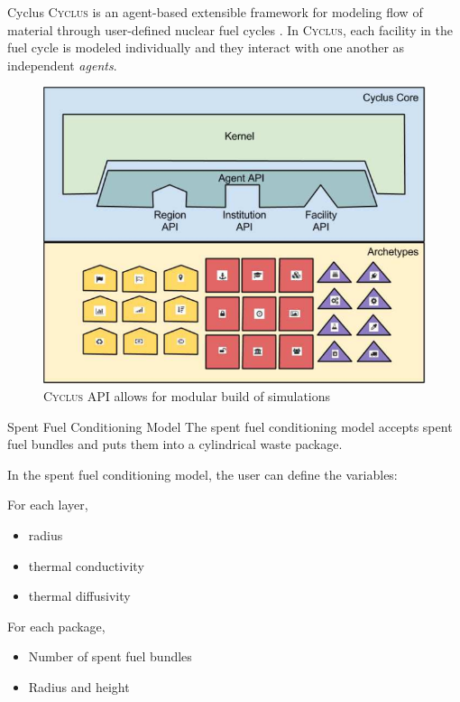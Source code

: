 \documentclass[final]{beamer}
\newlength{\onecolwid}
\newlength{\threecolwid}
\newcommand{\Cyclus}{\textsc{Cyclus}\xspace}%
\begin{document}
\begin{frame}[t]
\begin{columns}[t,totalwidth=\threecolwid]
\begin{column}{\onecolwid}
\begin{block}{Cyclus}
\Cyclus is an agent-based extensible framework for modeling flow of material 
through user-defined nuclear fuel cycles \cite{huff_fundamental_2016}. 
In \Cyclus, each facility in the fuel cycle is modeled individually 
and they interact with one another as independent \textit{agents}. 
\begin{figure}
	\includegraphics[width=0.9\linewidth]{Cyclus_graph}
	\caption{\Cyclus API allows for modular build of simulations \cite{huff_fundamental_2016}}
\end{figure}

\end{block}

\begin{block}{Spent Fuel Conditioning Model}
The spent fuel conditioning model accepts spent fuel bundles and puts them into a cylindrical
waste package. 
	
In the spent fuel conditioning model, the user can define the variables:  

For each layer, 
\begin{itemize}
	\item radius 
	\item thermal conductivity 
	\item thermal diffusivity
\end{itemize}
For each package,
\begin{itemize}
	\item Number of spent fuel bundles
	\item Radius and height
\end{itemize}

\end{block}


\end{column}
\end{columns}
\end{frame}
\end{document}
